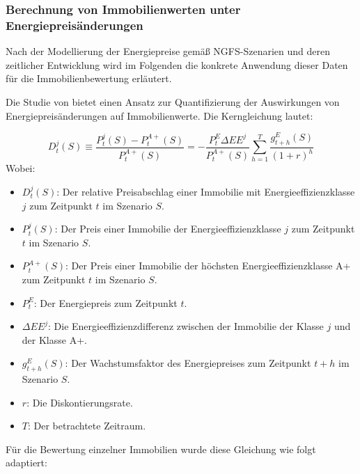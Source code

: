 \subsubsection{Berechnung von Immobilienwerten unter Energiepreisänderungen}\label{sec:endenfkt}
Nach der Modellierung der Energiepreise gemäß NGFS-Szenarien und deren zeitlicher Entwicklung wird im Folgenden die konkrete Anwendung dieser Daten für die Immobilienbewertung erläutert.

Die Studie von \parencite{tergerman} bietet einen Ansatz zur Quantifizierung der Auswirkungen von Energiepreisänderungen auf Immobilienwerte. Die Kerngleichung lautet:

\begin{equation}
D^j_t(S) \equiv \frac{P^j_t(S) - P^{A+}_t(S)}{P^{A+}_t(S)} = -\frac{P^E_t \Delta EE^j}{P^{A+}_t(S)} \sum_{h=1}^T \frac{g^E_{t+h}(S)}{(1 + r)^h}
\end{equation}
Wobei:
\begin{itemize}
    \item $D^j_t(S)$: Der relative Preisabschlag einer Immobilie mit Energieeffizienzklasse $j$ zum Zeitpunkt $t$ im Szenario $S$.
    \item $P^j_t(S)$: Der Preis einer Immobilie der Energieeffizienzklasse $j$ zum Zeitpunkt $t$ im Szenario $S$.
    \item $P^{A+}_t(S)$: Der Preis einer Immobilie der höchsten Energieeffizienzklasse A+ zum Zeitpunkt $t$ im Szenario $S$.
    \item $P^E_t$: Der Energiepreis zum Zeitpunkt $t$.
    \item $\Delta EE^j$: Die Energieeffizienzdifferenz zwischen der Immobilie der Klasse $j$ und der Klasse A+.
    \item $g^E_{t+h}(S)$: Der Wachstumsfaktor des Energiepreises zum Zeitpunkt $t+h$ im Szenario $S$.
    \item $r$: Die Diskontierungsrate.
    \item $T$: Der betrachtete Zeitraum.
\end{itemize}
Für die Bewertung einzelner Immobilien wurde diese Gleichung wie folgt adaptiert:

